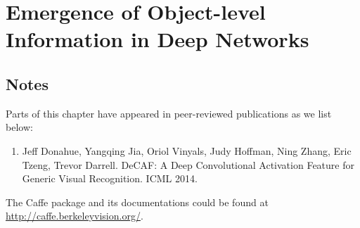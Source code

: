 \chapter{Emergence of Object-level Information in Deep Networks}






\section*{Notes}
Parts of this chapter have appeared in peer-reviewed publications as we list below:
\begin{enumerate}
\item Jeff Donahue, Yangqing Jia, Oriol Vinyals, Judy Hoffman, Ning Zhang, Eric Tzeng, Trevor Darrell. DeCAF: A Deep Convolutional Activation Feature for Generic Visual Recognition. ICML 2014.
\end{enumerate}
The Caffe package and its documentations could be found at \url{http://caffe.berkeleyvision.org/}.